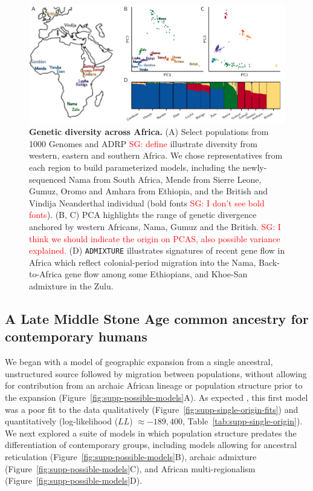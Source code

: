 \documentclass[]{article}
\newcommand{\sgcomment}[1]{{\textcolor{red}{SG: #1}}}
\begin{document}
\begin{figure}[ht!]
    \centering
    \includegraphics{figures/fig1.pdf}
    \caption{
        \textbf{Genetic diversity across Africa.}
        (A) Select populations from 1000 Genomes and ADRP   \sgcomment{define} illustrate diversity from
        western, eastern and southern Africa. We chose representatives from each region
        to build parameterized models, including the newly-sequenced Nama from South Africa, Mende
        from Sierre Leone, Gumuz, Oromo and Amhara from Ethiopia, and the
        British and Vindija Neanderthal individual (bold fonts \sgcomment{I don't see bold fonts}). (B, C) PCA highlights the range of genetic divergence anchored 
        by western Africans, Nama, Gumuz and the British. \sgcomment{I think we should indicate the origin on PCAS, also possible variance explained.} (D) \texttt{ADMIXTURE}
        illustrates signatures of recent gene flow in Africa which reflect colonial-period migration into the Nama,
        Back-to-Africa gene flow among some Ethiopians, and Khoe-San admixture in the Zulu.
    }
    \label{fig:1}
\end{figure}
   
\subsection*{A Late Middle Stone Age common ancestry for contemporary humans}

We began with a model of geographic expansion from a single ancestral,
unstructured source followed by migration between populations, without allowing
for contribution from an archaic African lineage or population structure prior
to the expansion (Figure~\ref{fig:supp-possible-models}A). As expected
\citep{Ragsdale2019-nt}, this first model was a poor fit to the data
qualitatively (Figure~\ref{fig:supp-single-origin-fits}) and quantitatively
(log-likelihood ($LL$) $\approx -189,400$, Table~\ref{tab:supp-single-origin}).
We next explored a suite of models in which population structure predates the
differentiation of contemporary groups, including models allowing for ancestral
reticulation (Figure~\ref{fig:supp-possible-models}B), archaic admixture
(Figure~\ref{fig:supp-possible-models}C), and African multi-regionalism
(Figure~\ref{fig:supp-possible-models}D).
\end{document}
